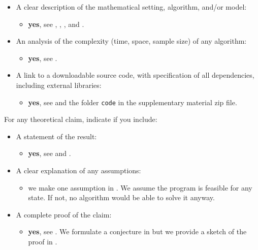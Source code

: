 \begin{itemize}
    \item  A clear description of the mathematical setting, algorithm, and/or model:
    
    \begin{itemize}\item \textbf{yes}, see , , ,
     and .
    \end{itemize}
    \item An analysis of the complexity (time, space, sample size) of any algorithm:
    \begin{itemize}\item \textbf{yes}, see .
    \end{itemize}
    \item A link to a downloadable source code, with specification of all dependencies, including external libraries:
    \begin{itemize}\item \textbf{yes}, see  and the folder \texttt{code} in the supplementary material zip file.
    \end{itemize}
\end{itemize}

For any theoretical claim, indicate if you include:

\begin{itemize}
    \item  A statement of the result:
     \begin{itemize}
        \item  \textbf{yes}, see  and .\end{itemize}
    \item A clear explanation of any assumptions:
    \begin{itemize}
        \item  we make one assumption in . We assume the program is feasible for any state. If not, no algorithm would be able to solve it anyway.\end{itemize}
    \item A complete proof of the claim:
    \begin{itemize}
        \item  \textbf{yes}, see . We formulate a conjecture in  but we provide a sketch of the proof in .\end{itemize}
\end{itemize}

